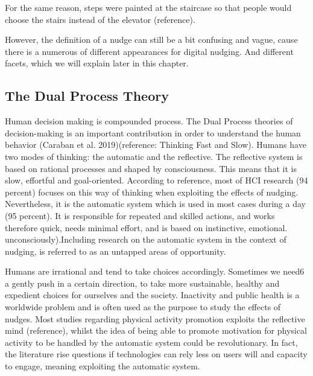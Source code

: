 For the same reason, steps were painted at the staircase so that people would choose the stairs instead of the elevator (reference). 


However, the definition of a nudge can still be a bit confusing and vague, cause there is a numerous of different appearances for digital nudging. And different facets, which we will explain later in this chapter. 

\subsection{The Dual Process Theory}
Human decision making is compounded process. The Dual Process theories of decision-making is an important contribution in order to understand the human behavior (Caraban et al. 2019)(reference:  Thinking Fast and Slow). Humans have two modes of thinking: the automatic and the reflective. The reflective system is based on rational processes and shaped by consciousness. This means that it is slow, effortful and goal-oriented. According to reference, most of HCI research (94 percent) focuses on this way of thinking when exploiting the effects of nudging. Nevertheless, it is the automatic system which is used in most cases during a day (95 percent). It is responsible for repeated and skilled actions, and works therefore quick, needs minimal effort, and is based on instinctive, emotional.  unconsciously).Including research on the automatic system in the context of nudging, is referred to as an untapped areas of opportunity.

Humans are irrational and tend to take choices accordingly. Sometimes we need6
a gently push in a certain direction, to take more sustainable, healthy and expedient choices for ourselves and the society. Inactivity and public health is a worldwide problem  and  is  often  used  as  the  purpose  to  study  the  effects  of  nudges.   Most  studies regarding physical activity promotion exploits the reflective mind (reference), whilst the idea of being able to promote motivation for physical activity to be handled by the automatic system could be revolutionary. In fact,  the literature rise questions if technologies can rely less on users will and capacity to engage, meaning exploiting the automatic system.

